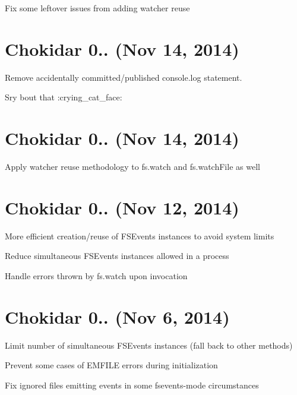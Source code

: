 \begin{DoxyItemize}
\item Fix some leftover issues from adding watcher reuse
\end{DoxyItemize}

\section*{Chokidar 0.. (Nov 14, 2014)}


\begin{DoxyItemize}
\item Remove accidentally committed/published {\ttfamily console.\+log} statement.
\item Sry \textquotesingle{}bout that \+:crying\+\_\+cat\+\_\+face\+:
\end{DoxyItemize}

\section*{Chokidar 0.. (Nov 14, 2014)}


\begin{DoxyItemize}
\item Apply watcher reuse methodology to {\ttfamily fs.\+watch} and {\ttfamily fs.\+watch\+File} as well
\end{DoxyItemize}

\section*{Chokidar 0.. (Nov 12, 2014)}


\begin{DoxyItemize}
\item More efficient creation/reuse of F\+S\+Events instances to avoid system limits
\item Reduce simultaneous F\+S\+Events instances allowed in a process
\item Handle errors thrown by {\ttfamily fs.\+watch} upon invocation
\end{DoxyItemize}

\section*{Chokidar 0.. (Nov 6, 2014)}


\begin{DoxyItemize}
\item Limit number of simultaneous F\+S\+Events instances (fall back to other methods)
\item Prevent some cases of E\+M\+F\+I\+LE errors during initialization
\item Fix ignored files emitting events in some fsevents-\/mode circumstances
\end{DoxyItemize}

